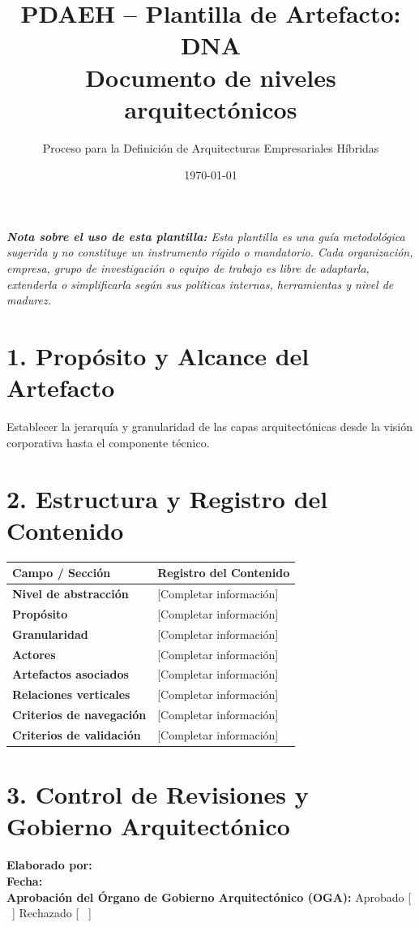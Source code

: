 \documentclass[11pt,a4paper]{article}
\title{\textbf{\color{brandgreen} PDAEH -- Plantilla de Artefacto: DNA} \\[0.3em] \large Documento de niveles arquitectónicos}
\author{Proceso para la Definición de Arquitecturas Empresariales Híbridas}
\date{\today}
\begin{document}
\maketitle

\noindent \textit{\textbf{Nota sobre el uso de esta plantilla:} Esta plantilla es una guía metodológica sugerida y no constituye un instrumento rígido o mandatorio. Cada organización, empresa, grupo de investigación o equipo de trabajo es libre de adaptarla, extenderla o simplificarla según sus políticas internas, herramientas y nivel de madurez.}

\section*{1. Propósito y Alcance del Artefacto}
Establecer la jerarquía y granularidad de las capas arquitectónicas desde la visión corporativa hasta el componente técnico.

\section*{2. Estructura y Registro del Contenido}
\begin{tabularx}{\textwidth}{|>{\bfseries}p{4.5cm}|X|}
    \hline
    \rowcolor[gray]{0.92} Campo / Sección & Registro del Contenido \\ \hline
    \textbf{Nivel de abstracción} & [Completar información] \\ \hline
    \textbf{Propósito} & [Completar información] \\ \hline
    \textbf{Granularidad} & [Completar información] \\ \hline
    \textbf{Actores} & [Completar información] \\ \hline
    \textbf{Artefactos asociados} & [Completar información] \\ \hline
    \textbf{Relaciones verticales} & [Completar información] \\ \hline
    \textbf{Criterios de navegación} & [Completar información] \\ \hline
    \textbf{Criterios de validación} & [Completar información] \\ \hline
\end{tabularx}

\vspace{1.2cm}
\section*{3. Control de Revisiones y Gobierno Arquitectónico}
\noindent \textbf{Elaborado por:} \hrulefill \\[0.5em]
\textbf{Fecha:} \hrulefill \\[0.5em]
\textbf{Aprobación del Órgano de Gobierno Arquitectónico (OGA):} Aprobado [ \, ] \quad Rechazado [ \, ]
\end{document}

